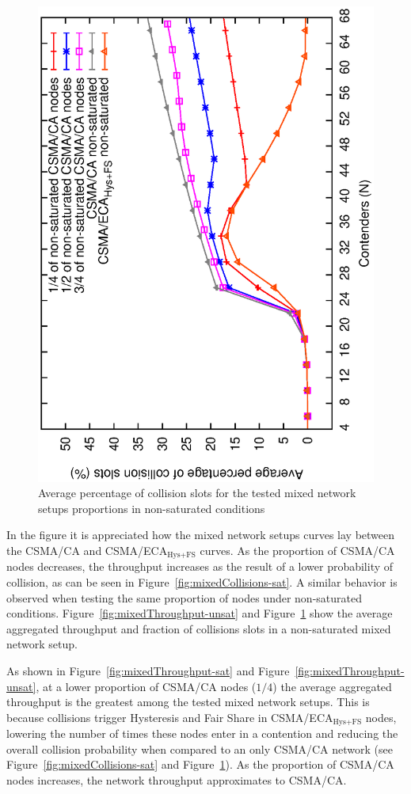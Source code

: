 \documentclass[a4paper,journal]{IEEEtran}
\begin{document}
	\begin{figure}[tb!!!]
		\centering
		\includegraphics[width=0.7\linewidth,angle=-90]{figures/unsaturated/mixed/collisions-mixed/collisions-mixed-unsaturated.eps}
		\caption{Average percentage of collision slots for the tested mixed network setups proportions in non-saturated conditions}
		\label{fig:mixCollisions-unsat}
	\end{figure}
	
	In the figure it is appreciated how the mixed network setups curves lay between the CSMA/CA and CSMA/ECA$_{\text{Hys+FS}}$ curves. As the proportion of CSMA/CA nodes decreases, the throughput increases as the result of a lower probability of collision, as can be seen in Figure~\ref{fig:mixedCollisions-sat}. A similar behavior is observed when testing the same proportion of nodes under non-saturated conditions. Figure~\ref{fig:mixedThroughput-unsat} and Figure~\ref{fig:mixCollisions-unsat} show the average aggregated throughput and fraction of collisions slots in a non-saturated mixed network setup.
	
	As shown in Figure~\ref{fig:mixedThroughput-sat} and Figure~\ref{fig:mixedThroughput-unsat}, at a lower proportion of CSMA/CA nodes ($1/4$) the average aggregated throughput is the greatest among the tested mixed network setups. This is because collisions trigger Hysteresis and Fair Share in CSMA/ECA$_{\text{Hys+FS}}$ nodes, lowering the number of times these nodes enter in a contention and reducing the overall collision probability when compared to an only CSMA/CA network (see Figure~\ref{fig:mixedCollisions-sat} and Figure~\ref{fig:mixCollisions-unsat}). As the proportion of CSMA/CA nodes increases, the network throughput approximates to CSMA/CA.	
\end{document}
